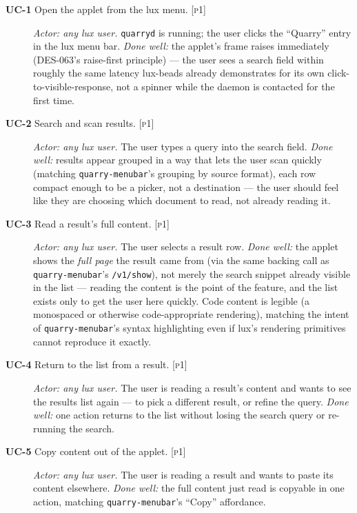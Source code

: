 \documentclass[a4paper,11pt]{report}
\newcommand{\uc}[1]{\textbf{UC-#1}}
\newcommand{\pone}{\textsc{[p1]}}
\begin{document}
\begin{description}

\item[\uc{1} Open the applet from the lux menu. \pone{}] \emph{Actor: any
  lux user.} \texttt{quarryd} is running; the user clicks the ``Quarry''
  entry in the lux menu bar. \emph{Done well:} the applet's frame raises
  immediately (DES-063's raise-first principle) --- the user sees a search
  field within roughly the same latency lux-beads already demonstrates for
  its own click-to-visible-response, not a spinner while the daemon is
  contacted for the first time.

\item[\uc{2} Search and scan results. \pone{}] \emph{Actor: any lux user.}
  The user types a query into the search field. \emph{Done well:} results
  appear grouped in a way that lets the user scan quickly (matching
  \texttt{quarry-menubar}'s grouping by source format), each row compact
  enough to be a picker, not a destination --- the user should feel like
  they are choosing which document to read, not already reading it.

\item[\uc{3} Read a result's full content. \pone{}] \emph{Actor: any lux
  user.} The user selects a result row. \emph{Done well:} the applet shows
  the \emph{full page} the result came from (via the same backing call as
  \texttt{quarry-menubar}'s \texttt{/v1/show}), not merely the search
  snippet already visible in the list --- reading the content is the
  point of the feature, and the list exists only to get the user here
  quickly. Code content is legible (a monospaced or otherwise
  code-appropriate rendering), matching the intent of
  \texttt{quarry-menubar}'s syntax highlighting even if lux's rendering
  primitives cannot reproduce it exactly.

\item[\uc{4} Return to the list from a result. \pone{}] \emph{Actor: any
  lux user.} The user is reading a result's content and wants to see the
  results list again --- to pick a different result, or refine the
  query. \emph{Done well:} one action returns to the list without losing
  the search query or re-running the search.

\item[\uc{5} Copy content out of the applet. \pone{}] \emph{Actor: any lux
  user.} The user is reading a result and wants to paste its content
  elsewhere. \emph{Done well:} the full content just read is copyable in
  one action, matching \texttt{quarry-menubar}'s ``Copy'' affordance.


\end{description}
\end{document}
